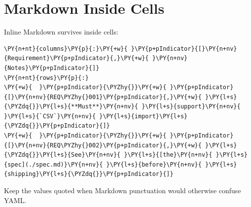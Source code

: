\documentclass[a4paper,twoside]{article}
\begin{document}
\section{Markdown Inside Cells}
Inline Markdown survives inside cells:
\begin{tscode}[lang=yaml, engine=pygments]
\begin{Verbatim}[commandchars=\\\{\},breaklines, breakanywhere, commandchars=\\\{\}]
\PY{n+nt}{columns}\PY{p}{:}\PY{+w}{ }\PY{p+pIndicator}{[}\PY{n+nv}{Requirement}\PY{p+pIndicator}{,}\PY{+w}{ }\PY{n+nv}{Notes}\PY{p+pIndicator}{]}
\PY{n+nt}{rows}\PY{p}{:}
\PY{+w}{  }\PY{p+pIndicator}{\PYZhy{}}\PY{+w}{ }\PY{p+pIndicator}{[}\PY{n+nv}{REQ\PYZhy{}001}\PY{p+pIndicator}{,}\PY{+w}{ }\PY{l+s}{\PYZdq{}}\PY{l+s}{**Must**}\PY{n+nv}{ }\PY{l+s}{support}\PY{n+nv}{ }\PY{l+s}{`CSV`}\PY{n+nv}{ }\PY{l+s}{import}\PY{l+s}{\PYZdq{}}\PY{p+pIndicator}{]}
\PY{+w}{  }\PY{p+pIndicator}{\PYZhy{}}\PY{+w}{ }\PY{p+pIndicator}{[}\PY{n+nv}{REQ\PYZhy{}002}\PY{p+pIndicator}{,}\PY{+w}{ }\PY{l+s}{\PYZdq{}}\PY{l+s}{See}\PY{n+nv}{ }\PY{l+s}{[the}\PY{n+nv}{ }\PY{l+s}{spec](./spec.md)}\PY{n+nv}{ }\PY{l+s}{before}\PY{n+nv}{ }\PY{l+s}{shipping}\PY{l+s}{\PYZdq{}}\PY{p+pIndicator}{]}
\end{Verbatim}
\end{tscode}
Keep the values quoted when Markdown punctuation would otherwise confuse YAML.
\end{document}
